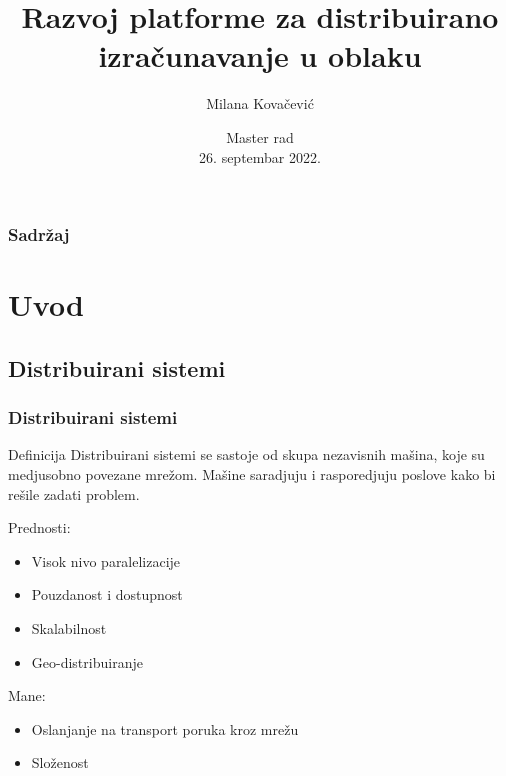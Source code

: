 \documentclass[11pt]{beamer}
\title[Razvoj platforme za distribuirano izračunavanje]{Razvoj platforme za distribuirano izračunavanje u oblaku}
\author{Milana Kovačević}
\institute[MATF]{Matematički fakultet, Univerzitet u Beogradu} %
\date{Master rad \\26. septembar 2022.}
\begin{document}

\begin{frame}
	\titlepage
\end{frame}


\begin{frame}
	\frametitle{Sadržaj}	
	\tableofcontents
\end{frame}


\section{Uvod}


\subsection{Distribuirani sistemi}

\begin{frame}
	\frametitle{Distribuirani sistemi}
	
	\begin{block}{Definicija}
		Distribuirani sistemi se sastoje od skupa nezavisnih mašina, koje su medjusobno povezane mrežom. Mašine saradjuju i rasporedjuju poslove kako bi rešile zadati problem.
	\end{block}
	
	\bigskip
	
	Prednosti:
		\begin{itemize}
			\item Visok nivo paralelizacije
			\item Pouzdanost i dostupnost %
			\item Skalabilnost %
			\item Geo-distribuiranje
		\end{itemize}

	\bigskip

	Mane:
		\begin{itemize}
			\item Oslanjanje na transport poruka kroz mrežu
			\item Složenost
		\end{itemize}

\end{frame}
\end{document}
